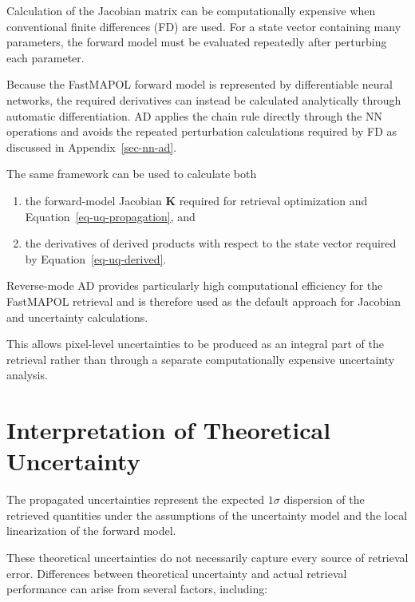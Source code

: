 \documentclass[
  11pt,
  letterpaper,
]{scrreprt}
\providecommand{\tightlist}{%
  \setlength{\itemsep}{0pt}\setlength{\parskip}{0pt}}
\begin{document}
Calculation of the Jacobian matrix can be computationally expensive when
conventional finite differences (FD) are used. For a state vector
containing many parameters, the forward model must be evaluated
repeatedly after perturbing each parameter.

Because the FastMAPOL forward model is represented by differentiable
neural networks, the required derivatives can instead be calculated
analytically through automatic differentiation. AD applies the chain
rule directly through the NN operations and avoids the repeated
perturbation calculations required by FD as discussed in
Appendix~\ref{sec-nn-ad}.

The same framework can be used to calculate both

\begin{enumerate}
\def\labelenumi{\arabic{enumi}.}
\tightlist
\item
  the forward-model Jacobian \(\mathbf{K}\) required for retrieval
  optimization and Equation~\ref{eq-uq-propagation}, and
\item
  the derivatives of derived products with respect to the state vector
  required by Equation~\ref{eq-uq-derived}.
\end{enumerate}

Reverse-mode AD provides particularly high computational efficiency for
the FastMAPOL retrieval and is therefore used as the default approach
for Jacobian and uncertainty calculations.

This allows pixel-level uncertainties to be produced as an integral part
of the retrieval rather than through a separate computationally
expensive uncertainty analysis.

\section{Interpretation of Theoretical
Uncertainty}\label{interpretation-of-theoretical-uncertainty}

The propagated uncertainties represent the expected \(1\sigma\)
dispersion of the retrieved quantities under the assumptions of the
uncertainty model and the local linearization of the forward model.

These theoretical uncertainties do not necessarily capture every source
of retrieval error. Differences between theoretical uncertainty and
actual retrieval performance can arise from several factors, including:
\end{document}

